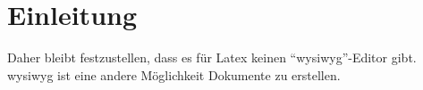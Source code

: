 \chapter{Einleitung}\label{sec:einleitung}
\blindtext
Daher bleibt festzustellen,
dass es für Latex keinen \enquote{\ac{wysiwyg}}-Editor gibt.
\ac{wysiwyg} ist eine andere Möglichkeit Dokumente zu erstellen.